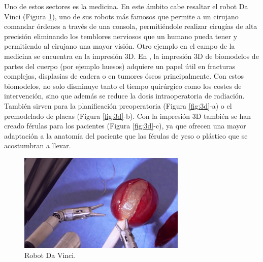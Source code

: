 Uno de estos sectores es la medicina. En este ámbito cabe resaltar el robot Da Vinci (Figura \ref{fig:da-vinci}), uno de sus robots más famosos que permite a un cirujano comandar órdenes a través de una consola, permitiéndole realizar cirugías de alta precisión eliminando los temblores nerviosos que un humano pueda tener y permitiendo al cirujano una mayor visión. Otro ejemplo en el campo de la medicina se encuentra en la impresión 3D. En \cite{ANDRESCANO2021138}, la impresión 3D de biomodelos de partes del cuerpo (por ejemplo huesos) adquiere un papel útil en fracturas complejas, displasias de cadera o en tumores óseos principalmente. Con estos biomodelos, no solo disminuye tanto el tiempo quirúrgico como los costes de intervención, sino que además se reduce la dosis intraoperatoria de radiación. También sirven para la planificación preoperatoria (Figura \ref{fig:3d}-a) o el premodelado de placas (Figura \ref{fig:3d}-b). Con la impresión 3D también se han creado férulas para los pacientes (Figura \ref{fig:3d}-c), ya que ofrecen una mayor adaptación a la anatomía del paciente que las férulas de yeso o plástico que se acostumbran a llevar.\\
\begin{figure} [h!]
  \begin{center}
    \includegraphics[width=8cm]{figs/da-vinci}
  \end{center}
  \caption{Robot Da Vinci.}
  \label{fig:da-vinci}
\end{figure}

